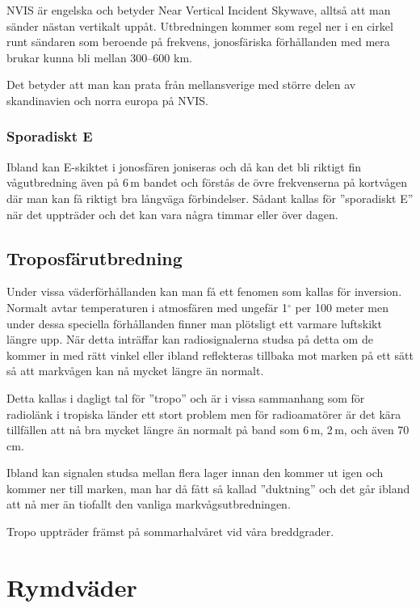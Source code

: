 NVIS är engelska och betyder Near Vertical Incident Skywave, alltså att man
sänder nästan vertikalt uppåt. Utbredningen kommer som regel ner i en cirkel
runt sändaren som beroende på frekvens, jonosfäriska förhållanden med mera
brukar kunna bli mellan 300--600 km.

Det betyder att man kan prata från mellansverige med större delen av
skandinavien och norra europa på NVIS.

\subsubsection{Sporadiskt E}

Ibland kan E-skiktet i jonosfären joniseras och då kan det bli riktigt fin
vågutbredning även på 6\,m bandet och förstås de övre frekvenserna på
kortvågen där man kan få riktigt bra långväga förbindelser. Sådant kallas för
''sporadiskt E'' när det uppträder och det kan vara några timmar eller över
dagen.

\subsection{Troposfärutbredning}

Under vissa väderförhållanden kan man få ett fenomen som kallas för inversion.
Normalt avtar temperaturen i atmosfären med ungefär 1$^\circ$ per 100 meter
men under dessa speciella förhållanden finner man plötsligt ett varmare
luftskikt längre upp. När detta inträffar kan radiosignalerna studsa på detta
om de kommer in med rätt vinkel eller ibland reflekteras tillbaka mot marken
på ett sätt så att markvågen kan nå mycket längre än normalt.

Detta kallas i dagligt tal för ''tropo'' och är i vissa sammanhang som för
radiolänk i tropiska länder ett stort problem men för radioamatörer är det
kära tillfällen att nå bra mycket längre än normalt på band som 6\,m, 2\,m,
och även 70\,cm.

Ibland kan signalen studsa mellan flera lager innan den kommer ut igen och
kommer ner till marken, man har då fått så kallad ''duktning'' och det går
ibland att nå mer än tiofallt den vanliga markvågsutbredningen.

Tropo uppträder främst på sommarhalvåret vid våra breddgrader.

\section{Rymdväder}

